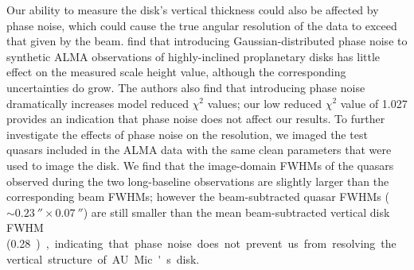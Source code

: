\documentclass[modern]{aastex62}
\begin{document}
Our ability to measure the disk's vertical thickness could also be affected by phase noise, which could cause the true angular resolution of the data to exceed that given by the beam.
\citet{boehler13} find that introducing Gaussian-distributed phase noise to synthetic ALMA observations of highly-inclined proplanetary disks has little effect on the measured scale height value, although the corresponding uncertainties do grow.
The authors also find that introducing phase noise dramatically increases model reduced $\chi^2$ values; our low reduced $\chi^2$ value of 1.027 provides an indication that phase noise does not affect our results.
To further investigate the effects of phase noise on the resolution, we imaged the test quasars included in the ALMA data with the same clean parameters that were used to image the disk.
We find that the image-domain FWHMs of the quasars observed during the two long-baseline observations are slightly larger than the corresponding beam FWHMs; however the beam-subtracted quasar FWHMs ($\sim \SI{0.23}{\arcsecond} \times \SI{0.07}{\arcsecond}$) are still smaller than the mean beam-subtracted vertical disk FWHM (\SI{0.28}), indicating that phase noise does not prevent us from resolving the vertical structure of AU Mic's disk.
\end{document}
